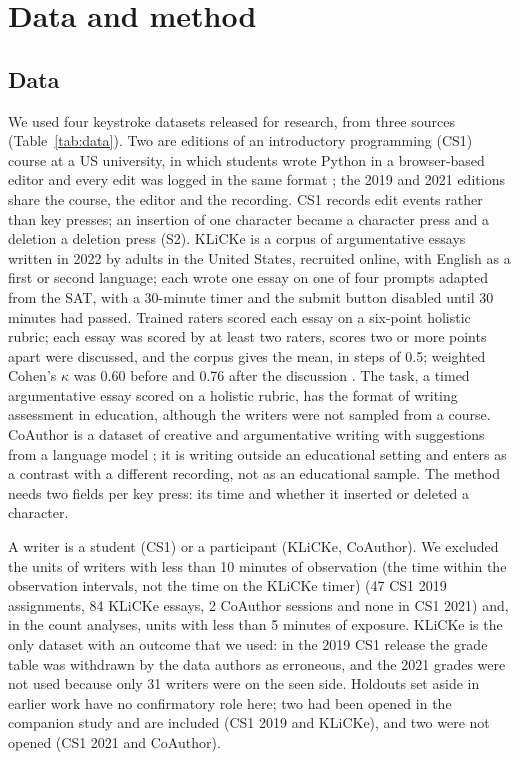 \section{Data and method}
\label{sec:method}

\subsection{Data}
\label{sec:data}

We used four keystroke datasets released for research, from three sources (Table~\ref{tab:data}). Two are editions of an
introductory programming (CS1) course at a US university, in which students wrote Python in a browser-based editor and
every edit was logged in the same format \cite{edwards2023cs1}; the 2019 and 2021 editions share the course, the
editor and the recording. CS1 records edit events rather than key presses; an insertion of one character became a
character press and a deletion a deletion press (S2). KLiCKe \cite{tian2025klicke} is a corpus of argumentative essays
written in 2022 by adults in the United States, recruited online, with English as a first or second language; each
wrote one essay on one of four prompts adapted from the SAT, with a 30-minute timer and the submit button disabled until
30 minutes had passed. Trained raters scored each essay on a six-point holistic rubric; each essay was scored by at
least two raters, scores two or more points apart were discussed, and the corpus gives the mean, in steps of 0.5; weighted
Cohen's $\kappa$ was 0.60 before and 0.76 after the discussion \cite{tian2025klicke}. The task, a timed argumentative essay scored on a holistic rubric, has the format of writing
assessment in education, although the writers were not sampled from a course. CoAuthor is a dataset of creative and argumentative writing with suggestions from a language model
\cite{lee2022coauthor}; it is writing outside an educational setting and enters as a contrast with a different
recording, not as an educational sample. The method needs two fields per key press: its time and whether it inserted
or deleted a character.

A writer is a student (CS1) or a participant (KLiCKe, CoAuthor). We excluded the units of writers with less than 10
minutes of observation (the time within the observation intervals, not the time on the KLiCKe timer) (47 CS1 2019 assignments, 84 KLiCKe essays, 2 CoAuthor sessions and none in CS1 2021) and, in the count analyses, units with
less than 5 minutes of exposure. KLiCKe is the only dataset with an outcome that we used: in the 2019 CS1 release the
grade table was withdrawn by the data authors as erroneous, and the 2021 grades were not used because only 31 writers
were on the seen side. Holdouts set aside in earlier work have no confirmatory role here; two had been opened in the
companion study and are included (CS1 2019 and KLiCKe), and two were not opened (CS1 2021 and CoAuthor).

